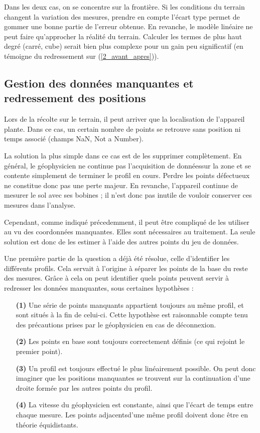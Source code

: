 \documentclass[12pt]{article}
\begin{document}
    Dans les deux cas, on se concentre sur la frontière. Si les conditions du terrain changent la variation des mesures, prendre en compte l'écart type permet de gommer une bonne partie de l'erreur obtenue. En revanche, le modèle linéaire ne peut faire qu'approcher la réalité du terrain. Calculer les termes de plus haut degré (carré, cube) serait bien plus complexe pour un gain peu significatif (en témoigne du redressement sur (\ref{2_avant_apres})).    

\newpage
\subsection{Gestion des données manquantes et redressement des positions}\label{2-don_manq}

    Lors de la récolte sur le terrain, il peut arriver que la localisation de l'appareil plante. Dans ce cas, un certain nombre de points se retrouve sans position ni temps associé (champs NaN, Not a Number).

    La solution la plus simple dans ce cas est de les supprimer complètement. En général, le géophysicien ne continue pas l'acquisition de donnéessur la zone et se contente simplement de terminer le profil en cours. Perdre les points défectueux ne constitue donc pas une perte majeur. En revanche, l'appareil continue de mesurer le sol avec ses bobines ; il n'est donc pas inutile de vouloir conserver ces mesures dans l'analyse.

    Cependant, comme indiqué précedemment, il peut être compliqué de les utiliser au vu des coordonnées manquantes. Elles sont nécessaires au traitement. La seule solution est donc de les estimer à l'aide des autres points du jeu de données.

    Une première partie de la question a déjà été résolue, celle d'identifier les différents profils. Cela servait à l'origine à séparer les points de la base du reste des mesures. Grâce à cela on peut identifier quels points peuvent servir à redresser les données manquantes, sous certaines hypothèses : 

    \begin{enumerate}
        \item[\textbf{(1)}] Une série de points manquants appartient toujours au même profil, et sont situés à la fin de celui-ci. Cette hypothèse est raisonnable compte tenu des précautions prises par le géophysicien en cas de déconnexion.
        \item[\textbf{(2)}] Les points en base sont toujours correctement définis (ce qui rejoint le premier point).
        \item[\textbf{(3)}] Un profil est toujours effectué le plus linéairement possible. On peut donc imaginer que les positions manquantes se trouvent sur la continuation d'une droite formée par les autres points du profil.
        \item[\textbf{(4)}] La vitesse du géophysicien est constante, ainsi que l'écart de temps entre chaque mesure. Les points adjacentsd'une même profil doivent donc être en théorie équidistants.
    \end{enumerate}
\end{document}
